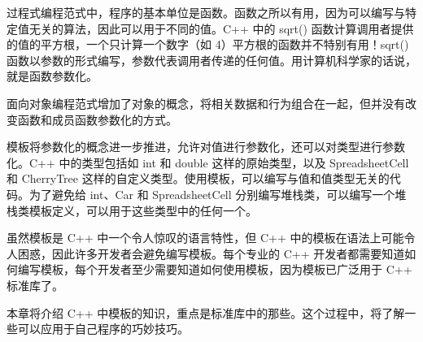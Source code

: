 过程式编程范式中，程序的基本单位是函数。函数之所以有用，因为可以编写与特定值无关的算法，因此可以用于不同的值。C++ 中的 sqrt() 函数计算调用者提供的值的平方根，一个只计算一个数字（如 4）平方根的函数并不特别有用！sqrt() 函数以参数的形式编写，参数代表调用者传递的任何值。用计算机科学家的话说，就是函数参数化。

面向对象编程范式增加了对象的概念，将相关数据和行为组合在一起，但并没有改变函数和成员函数参数化的方式。

模板将参数化的概念进一步推进，允许对值进行参数化，还可以对类型进行参数化。C++ 中的类型包括如 int 和 double 这样的原始类型，以及 SpreadsheetCell 和 CherryTree 这样的自定义类型。使用模板，可以编写与值和值类型无关的代码。为了避免给 int、Car 和 SpreadsheetCell 分别编写堆栈类，可以编写一个堆栈类模板定义，可以用于这些类型中的任何一个。

虽然模板是 C++ 中一个令人惊叹的语言特性，但 C++ 中的模板在语法上可能令人困惑，因此许多开发者会避免编写模板。每个专业的 C++ 开发者都需要知道如何编写模板，每个开发者至少需要知道如何使用模板，因为模板已广泛用于 C++ 标准库了。

本章将介绍 C++ 中模板的知识，重点是标准库中的那些。这个过程中，将了解一些可以应用于自己程序的巧妙技巧。
